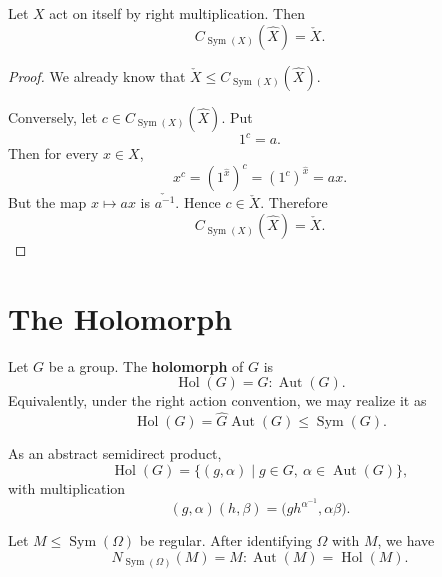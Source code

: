\begin{lemma}
Let \(X\) act on itself by right multiplication. Then
\[
    C_{\operatorname{Sym}(X)}(\widehat X)=\check X.
\]
\end{lemma}

\begin{proof}
We already know that \(\check X\leq C_{\operatorname{Sym}(X)}(\widehat X)\).

Conversely, let \(c\in C_{\operatorname{Sym}(X)}(\widehat X)\). Put
\[
    1^c=a.
\]
Then for every \(x\in X\),
\[
    x^c
    =
    (1^{\widehat x})^c
    =
    (1^c)^{\widehat x}
    =
    ax.
\]
But the map \(x\mapsto ax\) is \(\check{a^{-1}}\). Hence \(c\in\check X\).
Therefore
\[
    C_{\operatorname{Sym}(X)}(\widehat X)=\check X.
\]
\end{proof}

\section{The Holomorph}

\begin{definition}[Holomorph]
Let \(G\) be a group. The \textbf{holomorph} of \(G\) is
\[
    \operatorname{Hol}(G)
    =
    G:\operatorname{Aut}(G).
\]
Equivalently, under the right action convention, we may realize it as
\[
    \operatorname{Hol}(G)
    =
    \widehat G\operatorname{Aut}(G)
    \leq
    \operatorname{Sym}(G).
\]

As an abstract semidirect product,
\[
    \operatorname{Hol}(G)
    =
    \{(g,\alpha)\mid g\in G,\ \alpha\in\operatorname{Aut}(G)\},
\]
with multiplication
\[
    (g,\alpha)(h,\beta)
    =
    \bigl(g h^{\alpha^{-1}},\alpha\beta\bigr).
\]
\end{definition}

\begin{lemma}
Let \(M\leq \operatorname{Sym}(\Omega)\) be regular. After identifying
\(\Omega\) with \(M\), we have
\[
    N_{\operatorname{Sym}(\Omega)}(M)
    =
    M:\operatorname{Aut}(M)
    =
    \operatorname{Hol}(M).
\]
\end{lemma}

